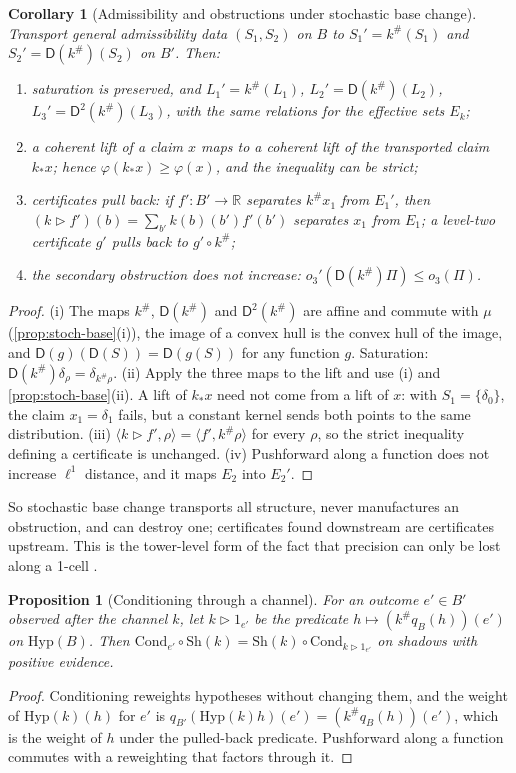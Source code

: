 \documentclass[11pt]{article}
\newtheorem{proposition}[theorem]{Proposition}
\newtheorem{corollary}[theorem]{Corollary}
\theoremstyle{definition}
\theoremstyle{remark}
\newcommand{\D}{\mathsf{D}}
\newcommand{\Hyp}{\mathrm{Hyp}}
\newcommand{\Sh}{\mathrm{Sh}}
\newcommand{\Cond}{\mathrm{Cond}}
\begin{document}
\begin{corollary}[Admissibility and obstructions under stochastic base change]\label{cor:stoch-adm}
Transport general admissibility data $(S_1,S_2)$ on $B$ to $S_1'=k^\#(S_1)$ and $S_2'=\D(k^\#)(S_2)$ on
$B'$. Then:
\begin{enumerate}[label=(\roman*)]
\item saturation is preserved, and $L_1'=k^\#(L_1)$, $L_2'=\D(k^\#)(L_2)$, $L_3'=\D^2(k^\#)(L_3)$, with
  the same relations for the effective sets $E_k$;
\item a coherent lift of a claim $x$ maps to a coherent lift of the transported claim $k_*x$; hence
  $\varphi(k_*x)\ge\varphi(x)$, and the inequality can be strict;
\item certificates pull back: if $f'\colon B'\to\mathbb{R}$ separates $k^\#x_1$ from $E_1'$, then
  $(k\rhd f')(b)=\sum_{b'}k(b)(b')f'(b')$ separates $x_1$ from $E_1$; a level-two certificate
  $g'$ pulls back to $g'\circ k^\#$;
\item the secondary obstruction does not increase: $o_3'(\D(k^\#)\Pi)\le o_3(\Pi)$.
\end{enumerate}
\end{corollary}
\begin{proof}
(i) The maps $k^\#$, $\D(k^\#)$ and $\D^2(k^\#)$ are affine and commute with $\mu$ (\cref{prop:stoch-base}(i)),
the image of a convex hull is the convex hull of the image, and $\D(g)(\D(S))=\D(g(S))$ for any function
$g$. Saturation: $\D(k^\#)\delta_\rho=\delta_{k^\#\rho}$. (ii) Apply the three maps to the lift and use (i)
and \cref{prop:stoch-base}(ii). A lift of $k_*x$ need not come from a lift of $x$: with
$S_1=\{\delta_0\}$, the claim $x_1=\delta_1$ fails, but a constant kernel sends both points to the same
distribution. (iii) $\langle k\rhd f',\rho\rangle=\langle f',k^\#\rho\rangle$ for every $\rho$, so the
strict inequality defining a certificate is unchanged. (iv) Pushforward along a function does not
increase $\ell^1$ distance, and it maps $E_2$ into $E_2'$.
\end{proof}

So stochastic base change transports all structure, never manufactures an obstruction, and can
destroy one; certificates found downstream are certificates upstream. This is the tower-level form of
the fact that precision can only be lost along a 1-cell \cite[Prop.~7.3]{Awasthi-Attribution}.

\begin{proposition}[Conditioning through a channel]\label{prop:stoch-cond}
For an outcome $e'\in B'$ observed after the channel $k$, let $k\rhd1_{e'}$ be the predicate
$h\mapsto (k^\#q_B(h))(e')$ on $\Hyp(B)$. Then
$\Cond_{e'}\circ\Sh(k)=\Sh(k)\circ\Cond_{k\rhd1_{e'}}$ on shadows with positive evidence.
\end{proposition}
\begin{proof}
Conditioning reweights hypotheses without changing them, and the weight of $\Hyp(k)(h)$ for $e'$ is
$q_{B'}(\Hyp(k)h)(e')=(k^\#q_B(h))(e')$, which is the weight of $h$ under the pulled-back predicate.
Pushforward along a function commutes with a reweighting that factors through it.
\end{proof}
\end{document}
